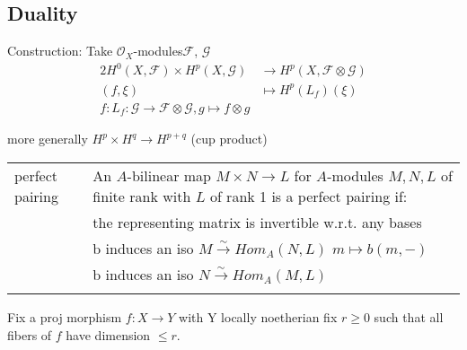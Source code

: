 \documentclass[a4paper, 12pt]{article}
\newcommand{\caf}{\mathcal{F}}
\newcommand{\cag}{\mathcal{G}}
\newcommand{\oxmods}{$\mathcal{O}_X$-modules}
\begin{document}
\subsection{Duality}


Construction: Take \oxmods $\caf $,  $ \cag$\\

%
%
%
%
%



\begin{alignat*}{2}
  H^0(X, \caf) \times H^p(X,\cag) & \longrightarrow H^p(X, \caf \otimes \cag)\\
  (f,\xi) & \longmapsto H^p(L_f)(\xi) \\
  f:L_f: \cag \rightarrow \caf \otimes \cag , g \mapsto f \otimes g
\end{alignat*}

 

more generally $H^p \times H^q \longrightarrow H^{p+q}$  (cup product)
%
%
%
%
%

\begin{longtable}{p{}  p{} }

  perfect pairing & An $A$-bilinear map $M\times N \longrightarrow L$ for $A$-modules $M,N,L$ of finite rank with $L$ of rank 1 is a perfect pairing if:\\

  & the representing matrix is invertible w.r.t. any bases\\
  & b induces an iso $M \xrightarrow{\sim} Hom_A(N,L)$  $m\mapsto b(m, -)$\\
  & b induces an iso $N \xrightarrow{\sim} Hom_A(M,L)$\\

  &\\

\end{longtable}

Fix a proj morphism $f:X \longrightarrow Y$ with Y locally noetherian fix $r \geq 0$ such that all fibers of $f$ have dimension $\leq r$.\\
\end{document}
